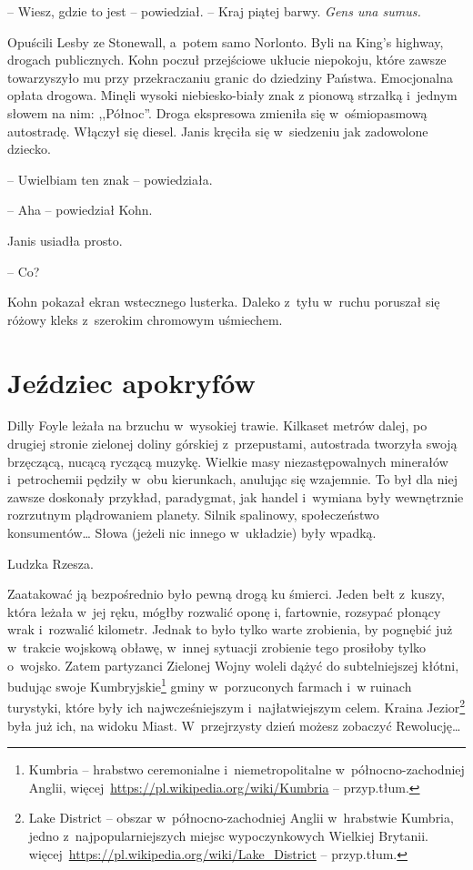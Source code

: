 \documentclass[oneside,polish,11pt,sfheadings]{mwbk}
\begin{document}
-- Wiesz, gdzie to jest -- powiedział. -- Kraj piątej barwy. \emph{Gens una
sumus.}

Opuścili Lesby ze Stonewall, a~potem samo Norlonto. Byli na King's
highway, drogach publicznych. Kohn poczuł przejściowe ukłucie niepokoju,
które zawsze towarzyszyło mu przy przekraczaniu granic do dziedziny
Państwa. Emocjonalna opłata drogowa. Minęli wysoki niebiesko-biały znak
z pionową strzałką i~jednym słowem na nim: ,,Północ''. Droga ekspresowa
zmieniła się w~ośmiopasmową autostradę. Włączył się diesel. Janis
kręciła się w~siedzeniu jak zadowolone dziecko.

-- Uwielbiam ten znak -- powiedziała.

-- Aha -- powiedział Kohn.

Janis usiadła prosto. 

-- Co?

Kohn pokazał ekran wstecznego lusterka. Daleko z~tyłu w~ruchu poruszał
się różowy kleks z~szerokim chromowym uśmiechem.

\chapter{Jeździec apokryfów}

Dilly Foyle leżała na brzuchu w~wysokiej trawie. Kilkaset metrów dalej,
po drugiej stronie zielonej doliny górskiej z~przepustami, autostrada
tworzyła swoją brzęczącą, nucącą ryczącą muzykę. Wielkie masy
niezastępowalnych minerałów i~petrochemii pędziły w~obu kierunkach,
anulując się wzajemnie. To był dla niej zawsze doskonały przykład,
paradygmat, jak handel i~wymiana były wewnętrznie rozrzutnym
plądrowaniem planety. Silnik spalinowy, społeczeństwo konsumentów\ldots
Słowa (jeżeli nic innego w~układzie) były wpadką.

Ludzka Rzesza.

Zaatakować ją bezpośrednio było pewną drogą ku śmierci. Jeden bełt z~kuszy, która leżała w~jej ręku, mógłby rozwalić oponę i, fartownie,
rozsypać płonący wrak i~rozwalić kilometr. Jednak to było tylko warte
zrobienia, by pognębić już w~trakcie wojskową obławę, w~innej sytuacji
zrobienie tego prosiłoby tylko o~wojsko. Zatem partyzanci Zielonej Wojny
woleli dążyć do subtelniejszej kłótni, budując swoje Kumbryjskie\footnote{
Kumbria -- hrabstwo ceremonialne i~niemetropolitalne w~północno-zachodniej Anglii,
więcej~\url{https://pl.wikipedia.org/wiki/Kumbria} -- przyp.tłum.} gminy w~porzuconych farmach i~w ruinach turystyki, które
były ich najwcześniejszym i~najłatwiejszym celem. Kraina Jezior\footnote{Lake
District -- obszar w~północno-zachodniej Anglii w~hrabstwie Kumbria,
jedno z~najpopularniejszych miejsc wypoczynkowych Wielkiej Brytanii.
więcej~\url{https://pl.wikipedia.org/wiki/Lake\_District} -- przyp.tłum.} była już ich, na widoku Miast. W~przejrzysty dzień możesz
zobaczyć Rewolucję\ldots
\end{document}
